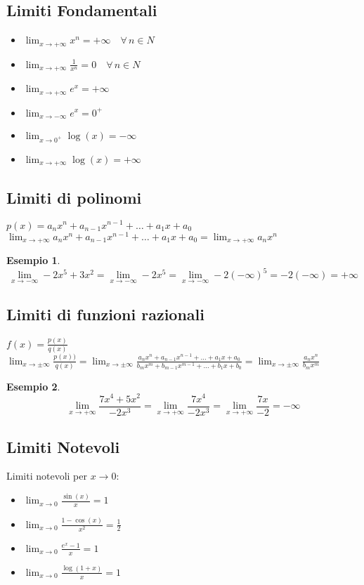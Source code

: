\documentclass[12pt, a4paper]{article}
\theoremstyle{break}
\newtheorem{example}{Esempio}[subsection]
\newcommand{\Lim}[3]{\lim_{#1} #2 = #3}
\begin{document}
    \subsection{Limiti Fondamentali}
    \begin{itemize}
        \item $\Lim{x\to +\infty}{x^n}{+\infty}\quad \forall\, n\in N$
        \item $\Lim{x\to +\infty}{\frac{1}{x^n}}{0}\quad \forall\, n\in N$
        \item $\Lim{x\to +\infty}{e^x}{+\infty}$
        \item $\Lim{x\to -\infty}{e^x}{0^+}$
        \item $\Lim{x\to 0^+}{\log(x)}{-\infty}$
        \item $\Lim{x\to +\infty}{\log(x)}{+\infty}$
    \end{itemize}
    \subsection{Limiti di polinomi}
    $p(x) = a_nx^n + a_{n-1}x^{n-1} + \dots + a_1x + a_0$\newline
    $\Lim{x\to +\infty}{a_nx^n + a_{n-1}x^{n-1} + \dots + a_1x + a_0}{\lim_{x\to +\infty}a_nx^n}$
    \begin{example}
        \[\Lim{x\to -\infty}{-2x^5+3x^2}{\Lim{x\to -\infty}{-2x^5}{\Lim{x\to -\infty}{-2(-\infty)^5}{-2(-\infty) = +\infty}}}\]
    \end{example}
    \subsection{Limiti di funzioni razionali}
    $f(x) = \frac{p(x)}{q(x)}$\newline
    $\Lim{x\to\pm\infty}{\frac{p(x))}{q(x)}}{\Lim{x\to\pm\infty}{\frac{a_nx^n + a_{n-1}x^{n-1} + \dots + a_1x + a_0}{b_mx^m + b_{m-1}x^{m-1} + \dots + b_1x + b_0}}{\lim_{x\to\pm\infty}\frac{a_nx^n}{b_mx^m}}}$
    \begin{example}
        \[\Lim{x\to +\infty}{\frac{7x^4+5x^2}{-2x^3}}{\Lim{x\to +\infty}{\frac{7x^4}{-2x^3}}{\Lim{x\to +\infty}{\frac{7x}{-2}}{-\infty}}}\]
    \end{example}
    \subsection{Limiti Notevoli}
    Limiti notevoli per $x\to 0$:
    \begin{itemize}
        \item $\Lim{x\to 0}{\frac{\sin(x)}{x}}{1}$
        \item $\Lim{x\to 0}{\frac{1-\cos(x)}{x^2}}{\frac{1}{2}}$
        \item $\Lim{x\to 0}{\frac{e^x-1}{x}}{1}$
        \item $\Lim{x\to 0}{\frac{\log(1+x)}{x}}{1}$
    \end{itemize}
\end{document}
